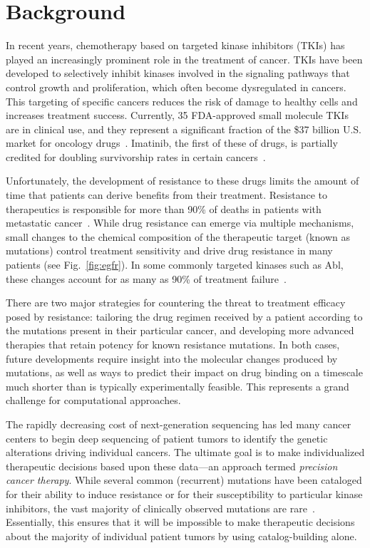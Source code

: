 \documentclass{bmcart}
\begin{document}

\section{Background}\label{sec:1}
In recent years, chemotherapy based on targeted kinase inhibitors (TKIs) has
played an increasingly prominent role in the treatment of cancer. TKIs have
been developed to selectively inhibit kinases involved in the signaling
pathways that control growth and proliferation, which often become
dysregulated in cancers. This targeting of specific cancers reduces the risk
of damage to healthy cells and increases treatment success. Currently, 35
FDA-approved small molecule TKIs are in clinical use, and they represent a
significant fraction of the \$37 billion U.S. market for oncology
drugs~\cite{FDA, Zhao2014}. Imatinib, the first of these of drugs, is
partially credited for doubling survivorship rates in certain
cancers~\cite{Zhao2014, ACSreport}.

Unfortunately, the development of resistance to these drugs limits the amount
of time that patients can derive benefits from their treatment. Resistance to
therapeutics is responsible for more than 90\% of deaths in patients with
metastatic cancer~\cite{Longley2005}. While drug resistance can emerge via
multiple mechanisms, small changes to the chemical composition of the
therapeutic target (known as mutations) control treatment sensitivity and
drive drug resistance in many patients (see Fig.~\ref{fig:egfr}). In some
commonly targeted kinases such as Abl, these changes account for as many as
90\% of treatment failure~\cite{Shah2002}.

There are two major strategies for countering the threat to treatment
efficacy posed by resistance: tailoring the drug regimen received by a
patient according to the mutations present in their particular cancer, and
developing more advanced therapies that retain potency for known resistance
mutations. In both cases, future developments require insight into the
molecular changes produced by mutations, as well as ways to predict their
impact on drug binding on a timescale much shorter than is typically
experimentally feasible. This represents a grand challenge for computational
approaches.

The rapidly decreasing cost of next-generation sequencing has led many cancer
centers to begin deep sequencing of patient tumors to identify the genetic
alterations driving individual cancers. The ultimate goal is to make
individualized therapeutic decisions based upon these data---an approach
termed \textit{precision cancer therapy}. While several common (recurrent)
mutations have been cataloged for their ability to induce resistance or for
their susceptibility to particular kinase inhibitors, the vast majority of
clinically observed mutations are rare~\cite{Soverini2011, Zehir2017}. 
Essentially, this ensures that it
will be impossible to make therapeutic decisions about the majority of
individual patient tumors by using catalog-building alone.
\end{document}

